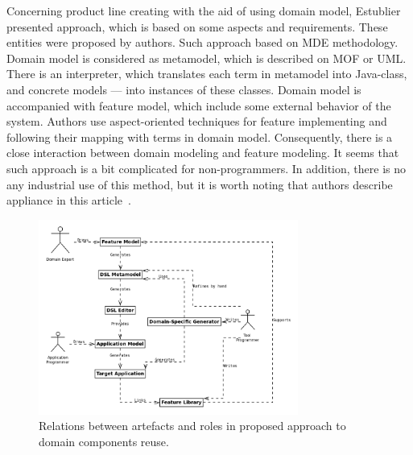 \documentclass[conference]{IEEEtran}
\begin{document}
Concerning product line creating with the aid of using domain model, Estublier~\cite{estublier2005reuse} presented approach, which is based on some aspects and requirements. These entities were proposed by authors. Such approach based on MDE methodology. Domain model is considered as  metamodel, which is described on MOF or UML. There is an interpreter, which translates each term in metamodel into Java-class, and concrete models --- into instances of these classes. Domain model is accompanied with feature model, which include some external behavior of the system. Authors use aspect-oriented techniques for feature implementing and following their  mapping with terms in domain model. Consequently, there is a close interaction between domain modeling and feature modeling. It seems that such approach is a bit complicated for non-programmers. In addition, there is no any industrial use of this method, but it is worth noting that authors describe appliance in this article~\cite{estublier2003approach}. 

\begin{figure}[ht]
	\centering
	\includegraphics[width=0.76\textwidth]{process.png}
	\caption{Relations between artefacts and roles in proposed approach to domain components reuse.}
	\label{image:process}
\end{figure}
\end{document}
